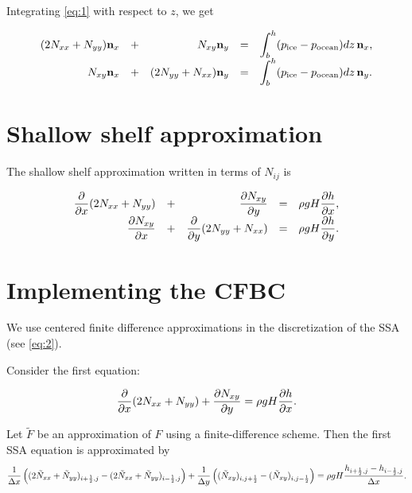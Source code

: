 \documentclass[11pt]{article}
\begin{document}
Integrating \eqref{eq:1} with respect to $z$, we get

\begin{equation}
\label{eq:3}
\begin{array}{rcrcl}
(2N_{xx} + N_{yy}) \mathbf{n}_{x} &+& N_{xy} \mathbf{n}_{y} &=& \displaystyle \int_{b}^{h}(p_{\text{ice}} - p_{\text{ocean}}) dz\, \mathbf{n}_{x},\\
N_{xy} \mathbf{n}_{x} &+& (2N_{yy} + N_{xx}) \mathbf{n}_{y} &=& \displaystyle \int_{b}^{h}(p_{\text{ice}} - p_{\text{ocean}}) dz\, \mathbf{n}_{y}.
\end{array}
\end{equation}

\section{Shallow shelf approximation}
\label{sec-3}

The shallow shelf approximation written in terms of $N_{ij}$ is

\begin{equation}
\label{eq:2}
\begin{array}{rcrcl}
\displaystyle \frac{\partial }{\partial x}(2N_{xx} + N_{yy}) &+& \displaystyle \frac{\partial N_{xy}}{\partial y} &=& \displaystyle \rho g H \frac{\partial h}{\partial x},\\
\displaystyle \frac{\partial N_{xy}}{\partial x} &+& \displaystyle \frac{\partial }{\partial y}(2N_{yy} + N_{xx}) &=& \displaystyle \rho g H \frac{\partial h}{\partial y}.
\end{array}
\end{equation}

\section{Implementing the CFBC}
\label{sec-4}

We use centered finite difference approximations in the discretization
of the SSA (see \eqref{eq:2}).

Consider the first equation:

\begin{equation}
\label{eq:4}
\frac{\partial }{\partial x}(2N_{xx} + N_{yy}) + \displaystyle \frac{\partial N_{xy}}{\partial y} = \displaystyle \rho g H \frac{\partial h}{\partial x}.
\end{equation}

\newcommand{\partI}{(2\tilde N_{xx} + \tilde N_{yy})}
\newcommand{\partII}{(\tilde N_{xy})}
Let $\tilde F$ be an approximation of $F$ using a finite-difference
scheme. Then the first SSA equation is approximated by
\begin{equation*}
\frac1{\dx}\left(\partI_{i+\frac12,j} - \partI_{i-\frac12,j}\right) +
\frac1{\dy}\left(\partII_{i,j+\frac12} - \partII_{i,j-\frac12}\right) =
\rho g H \frac{h_{i+\frac12,j} - h_{i-\frac12,j}}{\dx}.
\end{equation*}
\end{document}
